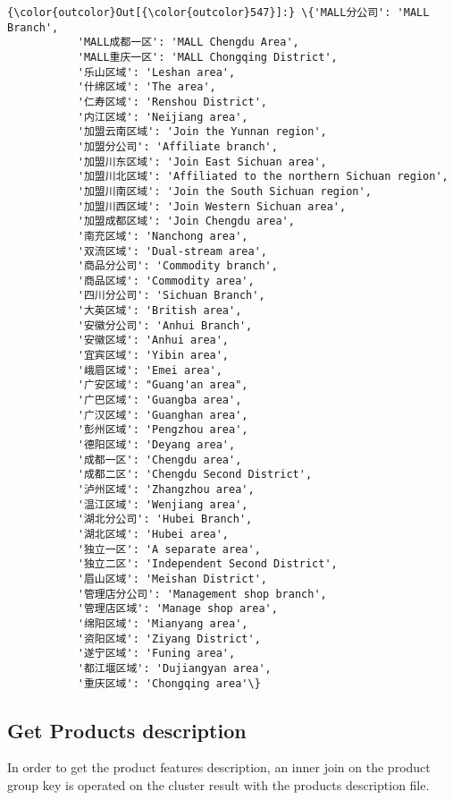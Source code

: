 \documentclass[11pt]{article}
\begin{document}
\begin{Verbatim}[commandchars=\\\{\}]
{\color{outcolor}Out[{\color{outcolor}547}]:} \{'MALL分公司': 'MALL Branch',
           'MALL成都一区': 'MALL Chengdu Area',
           'MALL重庆一区': 'MALL Chongqing District',
           '乐山区域': 'Leshan area',
           '什绵区域': 'The area',
           '仁寿区域': 'Renshou District',
           '内江区域': 'Neijiang area',
           '加盟云南区域': 'Join the Yunnan region',
           '加盟分公司': 'Affiliate branch',
           '加盟川东区域': 'Join East Sichuan area',
           '加盟川北区域': 'Affiliated to the northern Sichuan region',
           '加盟川南区域': 'Join the South Sichuan region',
           '加盟川西区域': 'Join Western Sichuan area',
           '加盟成都区域': 'Join Chengdu area',
           '南充区域': 'Nanchong area',
           '双流区域': 'Dual-stream area',
           '商品分公司': 'Commodity branch',
           '商品区域': 'Commodity area',
           '四川分公司': 'Sichuan Branch',
           '大英区域': 'British area',
           '安徽分公司': 'Anhui Branch',
           '安徽区域': 'Anhui area',
           '宜宾区域': 'Yibin area',
           '峨眉区域': 'Emei area',
           '广安区域': "Guang'an area",
           '广巴区域': 'Guangba area',
           '广汉区域': 'Guanghan area',
           '彭州区域': 'Pengzhou area',
           '德阳区域': 'Deyang area',
           '成都一区': 'Chengdu area',
           '成都二区': 'Chengdu Second District',
           '泸州区域': 'Zhangzhou area',
           '温江区域': 'Wenjiang area',
           '湖北分公司': 'Hubei Branch',
           '湖北区域': 'Hubei area',
           '独立一区': 'A separate area',
           '独立二区': 'Independent Second District',
           '眉山区域': 'Meishan District',
           '管理店分公司': 'Management shop branch',
           '管理店区域': 'Manage shop area',
           '绵阳区域': 'Mianyang area',
           '资阳区域': 'Ziyang District',
           '遂宁区域': 'Funing area',
           '都江堰区域': 'Dujiangyan area',
           '重庆区域': 'Chongqing area'\}
\end{Verbatim}
            
    \subsection{Get Products description}\label{get-products-description}

In order to get the product features description, an inner join on the
product group key is operated on the cluster result with the products
description file.
\end{document}
